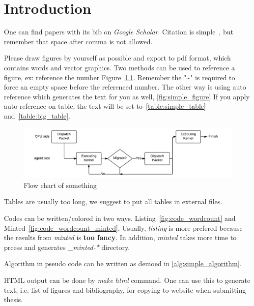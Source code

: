 \chapter{Introduction}
\label{chap:intro}

One can find papers with its bib on \emph{Google Scholar}.
Citation is simple~\cite{yeh2016flattened,intel_ocl_spm}, but remember that space after comma is not allowed.

Please draw figures by yourself as possible and export to pdf format, which contains words and vector graphics.
Two methods can be used to reference a figure, ex: reference the number Figure~\ref{fig:simple_figure}.
Remember the "\textasciitilde" is required to force an empty space before the referenced number.
The other way is using auto reference which generates the text for you as well, \autoref{fig:simple_figure}
If you apply auto reference on table, the text will be set to~\autoref{table:simple_table} and~\autoref{table:big_table}.

\begin{figure}[tbh!]
\centering
\includegraphics[width=0.95\columnwidth]{figures/flowchart}
\caption{Flow chart of something}
\label{fig:simple_figure}
\end{figure}

Tables are usually too long, we suggest to put all tables in external files.





Codes can be written/colored in two ways.
Listing~\autoref{fig:code_wordcount} and Minted~\autoref{fig:code_wordcount_minted}.
Usually, \emph{listing} is more prefered because the results from \emph{minted} is \textbf{too fancy}.
In addition, \emph{minted} takes more time to prcess and generates \emph{\_minted-*} directory.



Algorithm in pseudo code can be written as demoed in \autoref{alg:simple_algorithm}.



HTML output can be done by \emph{make html} command.
One can use this to generate text, i.e. list of figures and bibliography, for copying to website when submitting thesis.


